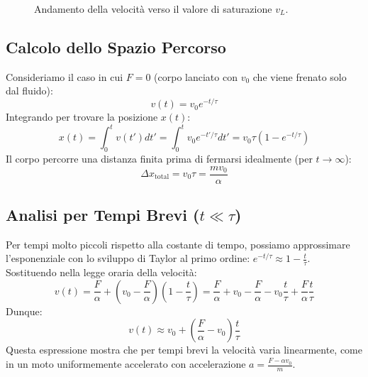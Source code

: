 \begin{figure}[ht]
    \centering
    \caption{Andamento della velocità verso il valore di saturazione $v_L$.}
\end{figure}

\subsection{Calcolo dello Spazio Percorso}
Consideriamo il caso in cui $F=0$ (corpo lanciato con $v_0$ che viene frenato solo dal fluido):
\begin{equation}
    v(t) = v_0 e^{-t/\tau}
\end{equation}
Integrando per trovare la posizione $x(t)$:
\begin{equation}
    x(t) = \int_0^t v(t') dt' = \int_0^t v_0 e^{-t'/\tau} dt' = v_0 \tau \left( 1 - e^{-t/\tau} \right)
\end{equation}
Il corpo percorre una distanza finita prima di fermarsi idealmente (per $t \to \infty$):
\begin{equation}
    \Delta x_{\text{total}} = v_0 \tau = \frac{m v_0}{\alpha}
\end{equation}
\subsection{Analisi per Tempi Brevi (\texorpdfstring{$t \ll \tau$}{t << tau})}
Per tempi molto piccoli rispetto alla costante di tempo, possiamo approssimare l'esponenziale con lo sviluppo di Taylor al primo ordine: $e^{-t/\tau} \approx 1 - \frac{t}{\tau}$.
Sostituendo nella legge oraria della velocità:
\begin{equation}
    v(t) = \frac{F}{\alpha} + \left( v_0 - \frac{F}{\alpha} \right) \left( 1 - \frac{t}{\tau} \right) = \frac{F}{\alpha} + v_0 - \frac{F}{\alpha} - v_0\frac{t}{\tau} + \frac{F}{\alpha}\frac{t}{\tau}
\end{equation}
Dunque:
\begin{equation}
    v(t) \approx v_0 + \left( \frac{F}{\alpha} - v_0 \right) \frac{t}{\tau}
\end{equation}
Questa espressione mostra che per tempi brevi la velocità varia linearmente, come in un moto uniformemente accelerato con accelerazione $a = \frac{F - \alpha v_0}{m}$.


